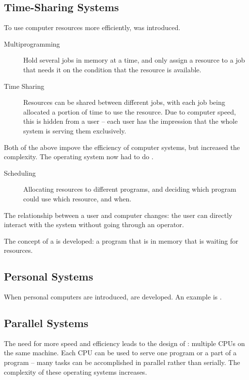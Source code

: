 \documentclass[\main/notes.tex]{subfiles}
\begin{document}
			\subsection{Time-Sharing Systems}
				To use computer resources more efficiently,  was introduced.
				\begin{indentparagraph}
					\begin{description}
						\item[Multiprogramming] Hold several jobs in memory at a time, and only assign a resource to a job that needs it on the condition that the resource is available.
						\item[Time Sharing] Resources can be shared between different jobs, with each job being allocated a portion of time to use the resource. Due to computer speed, this is hidden from a user -- each user has the impression that the whole system is serving them exclusively. 
					\end{description}
				\end{indentparagraph}
				Both of the above impove the efficiency of computer systems, but increased the complexity. The operating system now had to do .
				\begin{indentparagraph}
					\begin{description}
						\item[Scheduling] Allocating resources to different programs, and deciding which program could use which resource, and when.
					\end{description}
				\end{indentparagraph}
				The relationship between a user and computer changes: the user can directly interact with the system without going through an operator.

				The concept of a  is developed: a program that is in memory that is waiting for resources.
			\subsection{Personal Systems}
				When personal computers are introduced,  are developed. An example is .
			\subsection{Parallel Systems}
				The need for more speed and efficiency leads to the design of : multiple CPUs on the same machine. Each CPU can be used to serve one program or a part of a program -- many tasks can be accomplished in parallel rather than serially. The complexity of these operating systems increases.
\end{document}
